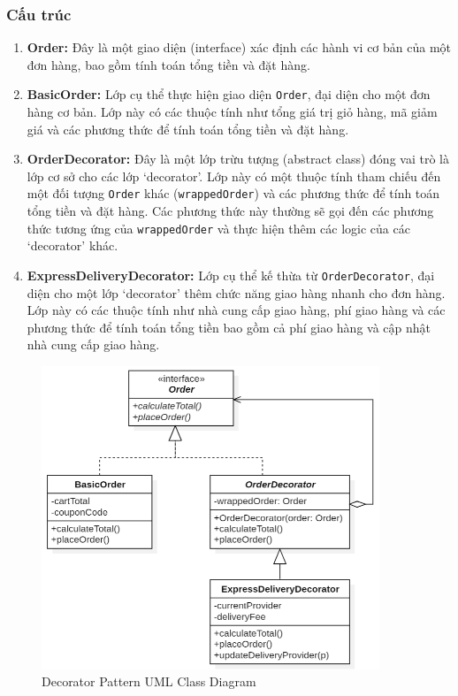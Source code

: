 \subsubsection{Cấu trúc}
\begin{flushleft}
    \begin{enumerate}
        \item \textbf{Order:} Đây là một giao diện (interface) xác định các hành vi cơ bản của một đơn hàng, bao gồm tính toán tổng tiền và đặt hàng.
        \item \textbf{BasicOrder:} Lớp cụ thể thực hiện giao diện \verb|Order|, đại diện cho một đơn hàng cơ bản. Lớp này có các thuộc tính như tổng giá trị giỏ hàng, mã giảm giá và các phương thức để tính toán tổng tiền và đặt hàng.
        \item \textbf{OrderDecorator:} Đây là một lớp trừu tượng (abstract class) đóng vai trò là lớp cơ sở cho các lớp `decorator'. Lớp này có một thuộc tính tham chiếu đến một đối tượng \verb|Order| khác (\verb|wrappedOrder|) và các phương thức để tính toán tổng tiền và đặt hàng. Các phương thức này thường sẽ gọi đến các phương thức tương ứng của \verb|wrappedOrder| và thực hiện thêm các logic của các `decorator' khác.
        \item \textbf{ExpressDeliveryDecorator:} Lớp cụ thể kế thừa từ \verb|OrderDecorator|, đại diện cho một lớp `decorator' thêm chức năng giao hàng nhanh cho đơn hàng. Lớp này có các thuộc tính như nhà cung cấp giao hàng, phí giao hàng và các phương thức để tính toán tổng tiền bao gồm cả phí giao hàng và cập nhật nhà cung cấp giao hàng.
    \end{enumerate}

    \begin{figure}[H]
        \centering
        \includegraphics[width=0.9\textwidth]{../assets/screenshots/uml/decorator.png}
        \caption{Decorator Pattern UML Class Diagram}
    \end{figure}
\end{flushleft}

